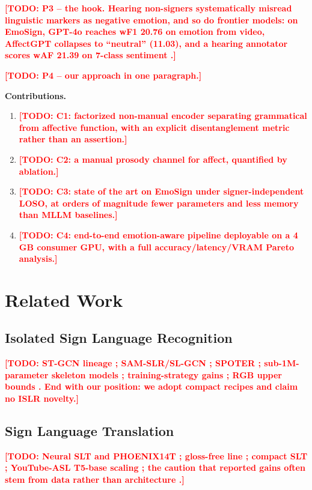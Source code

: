 \documentclass[conference]{IEEEtran}
\newcommand{\TODO}[1]{\textcolor{red}{\textbf{[TODO: #1]}}}
\begin{document}
\TODO{P3 -- the hook. Hearing non-signers systematically misread linguistic markers as negative
emotion, and so do frontier models: on EmoSign, GPT-4o reaches wF1 20.76 on emotion from video,
AffectGPT collapses to ``neutral'' (11.03), and a hearing annotator scores wAF 21.39 on 7-class
sentiment \cite{chua2025emosign}.}

\TODO{P4 -- our approach in one paragraph.}

\noindent\textbf{Contributions.}
\begin{enumerate}
  \item \TODO{C1: factorized non-manual encoder separating grammatical from affective function,
        with an explicit disentanglement metric rather than an assertion.}
  \item \TODO{C2: a manual prosody channel for affect, quantified by ablation.}
  \item \TODO{C3: state of the art on EmoSign under signer-independent LOSO, at orders of magnitude
        fewer parameters and less memory than MLLM baselines.}
  \item \TODO{C4: end-to-end emotion-aware pipeline deployable on a 4\,GB consumer GPU, with a full
        accuracy/latency/VRAM Pareto analysis.}
\end{enumerate}

\section{Related Work}
\label{sec:related}

\subsection{Isolated Sign Language Recognition}
\TODO{ST-GCN lineage \cite{yan2018stgcn}; SAM-SLR/SL-GCN \cite{jiang2021samslr}; SPOTER
\cite{bohacek2022spoter}; sub-1M-parameter skeleton models \cite{signbart2025}; training-strategy
gains \cite{trainingstrategies2024}; RGB upper bounds \cite{sandoval2023ssvt}. End with our
position: we adopt compact recipes and claim no ISLR novelty.}

\subsection{Sign Language Translation}
\TODO{Neural SLT and PHOENIX14T \cite{camgoz2018neural}; gloss-free line
\cite{zhou2023gfsltvlp,lin2023glofe,wong2024sign2gpt,liang2024llavaslt}; compact SLT
\cite{chen2026compactslt}; YouTube-ASL T5-base scaling \cite{uthus2023youtubeasl}; the caution that
reported gains often stem from data rather than architecture \cite{unbiased2026}.}
\end{document}

